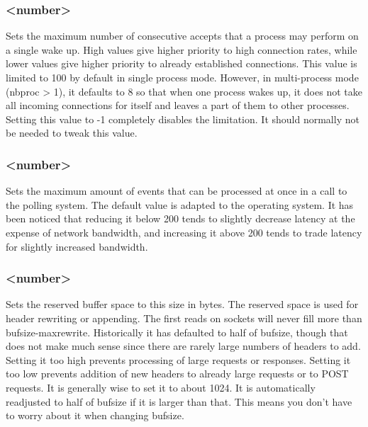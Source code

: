 \subsubsection[tune.maxaccept]{ <number>}

Sets the maximum number of consecutive accepts that a process may perform on
a single wake up. High values give higher priority to high connection rates,
while lower values give higher priority to already established connections.
This value is limited to 100 by default in single process mode. However, in
multi-process mode (nbproc > 1), it defaults to 8 so that when one process
wakes up, it does not take all incoming connections for itself and leaves a
part of them to other processes. Setting this value to -1 completely disables
the limitation. It should normally not be needed to tweak this value.

\subsubsection[tune.maxpollevents]{ <number>}

Sets the maximum amount of events that can be processed at once in a call to
the polling system. The default value is adapted to the operating system. It
has been noticed that reducing it below 200 tends to slightly decrease
latency at the expense of network bandwidth, and increasing it above 200
tends to trade latency for slightly increased bandwidth.

\subsubsection[tune.maxrewrite]{ <number>}

Sets the reserved buffer space to this size in bytes. The reserved space is
used for header rewriting or appending. The first reads on sockets will never
fill more than bufsize-maxrewrite. Historically it has defaulted to half of
bufsize, though that does not make much sense since there are rarely large
numbers of headers to add. Setting it too high prevents processing of large
requests or responses. Setting it too low prevents addition of new headers
to already large requests or to POST requests. It is generally wise to set it
to about 1024. It is automatically readjusted to half of bufsize if it is
larger than that. This means you don't have to worry about it when changing
bufsize.

